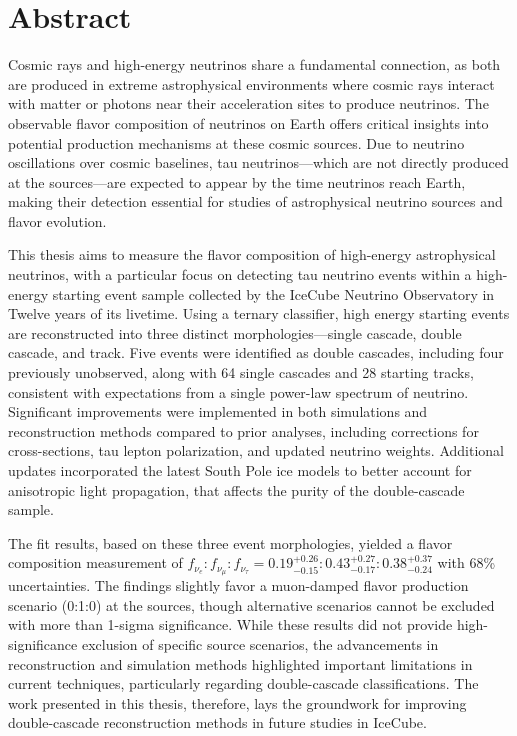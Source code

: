 \chapter{Abstract}
Cosmic rays and high-energy neutrinos share a fundamental connection, as both are produced in extreme astrophysical environments where cosmic rays interact with matter or photons near their acceleration sites to produce neutrinos. The observable flavor composition of neutrinos on Earth offers critical insights into potential production mechanisms at these cosmic sources. Due to neutrino oscillations over cosmic baselines, tau neutrinos—which are not directly produced at the sources—are expected to appear by the time neutrinos reach Earth, making their detection essential for studies of astrophysical neutrino sources and flavor evolution. 

This thesis aims to measure the flavor composition of high-energy astrophysical neutrinos, with a particular focus on detecting tau neutrino events within a high-energy starting event sample collected by the IceCube Neutrino Observatory in Twelve years of its livetime. Using a ternary classifier, high energy starting events are reconstructed into three distinct morphologies—single cascade, double cascade, and track. Five events were identified as double cascades, including four previously unobserved, along with 64 single cascades and 28 starting tracks, consistent with expectations from a single power-law spectrum of neutrino. Significant improvements were implemented in both simulations and reconstruction methods compared to prior analyses, including corrections for cross-sections, tau lepton polarization, and updated neutrino weights. Additional updates incorporated the latest South Pole ice models to better account for anisotropic light propagation, that affects the purity of the double-cascade sample.

The fit results, based on these three event morphologies, yielded a flavor composition measurement of \( f_{\nu_e} : f_{\nu_{\mu}} : f_{\nu_{\tau}} = 0.19_{-0.15}^{+0.26} : 0.43_{-0.17}^{+0.27} : 0.38_{-0.24}^{+0.37} \) with 68\% uncertainties. The findings slightly favor a muon-damped flavor production scenario (0:1:0) at the sources, though alternative scenarios cannot be excluded with more than 1-sigma significance. While these results did not provide high-significance exclusion of specific source scenarios, the advancements in reconstruction and simulation methods highlighted important limitations in current techniques, particularly regarding double-cascade classifications. The work presented in this thesis, therefore, lays the groundwork for improving double-cascade reconstruction methods in future studies in IceCube. 

